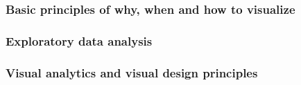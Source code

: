 \subsubsection{Basic principles of why, when and how to visualize}
\label{s:basics}


\subsubsection{Exploratory data analysis}
\label{s:eda}


\subsubsection{Visual analytics and visual design principles}
\label{s:va}

